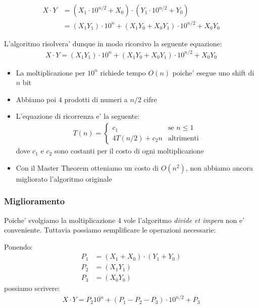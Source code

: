 \documentclass{article}
\begin{document}
\begin{align*}
  X \cdot Y &= (X_1 \cdot 10^{n/2} + X_0) \cdot (Y_1 \cdot 10^{n/2} + Y_0) \\
  &= (X_1 Y_1) \cdot 10^n + (X_1 Y_0 + X_0 Y_1) \cdot 10^{n/2} + X_0 Y_0
\end{align*}

L'algoritmo risolvera' dunque in modo ricorsivo la seguente equazione:
\begin{align*}
  X \cdot Y = (X_1 Y_1) \cdot 10^n + (X_1 Y_0 + X_0 Y_1) \cdot 10^{n/2} + X_0 Y_0
\end{align*}

\begin{itemize}
  \item La moltiplicazione per $10^n$ richiede tempo $O(n)$ poiche' esegue uno
    shift di $n$ bit
  \item Abbiamo poi $4$ prodotti di numeri a $n/2$ cifre
  \item L'equazione di ricorrenza e' la seguente:
  \begin{align*}
    T(n) = \begin{cases}
      c_1 &\text{se } n \leq 1 \\
      4 T(n/2) + c_2 n &\text{altrimenti}
    \end{cases}
  \end{align*}
  dove $c_1$ e $c_2$ sono costanti per il costo di ogni moltiplicazione
  \item Con il Master Theorem otteniamo un costo di $O(n^2)$, non abbiamo ancora
    migliorato l'algoritmo originale
\end{itemize}

\subsubsection{Miglioramento}

Poiche' svolgiamo la moltiplicazione 4 vole l'algoritmo \emph{divide et impera}
non e' conveniente. Tuttavia possiamo semplificare le operazioni necessarie:

Ponendo: 
\begin{align*}
  P_1 &= (X_1 + X_0) \cdot (Y_1 + Y_0) \\
  P_2 &= (X_1 Y_1) \\
  P_3 &= (X_0 Y_0)
\end{align*}
possiamo scrivere:
\begin{align*}
  X \cdot Y = P_2 10^n + (P_1 - P_2 - P_3) \cdot 10^{n/2} + P_3
\end{align*}
\end{document}
